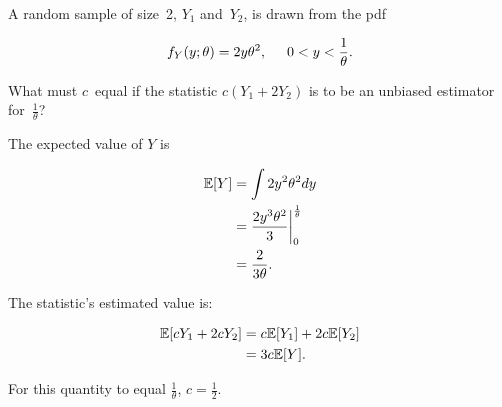 \begin{problem}
   A random sample of size~2, $Y_1$ and~$Y_2$, is drawn from the pdf

  \begin{equation}
    f_Y(y;\theta) = 2y\theta^2, \hspace{0.5cm}0 < y < \frac{1}{\theta} \text{.}
  \end{equation}

  \noindent
  What must $c$~equal if the statistic ${c(Y_1 + 2Y_2)}$ is to be an unbiased estimator for~$\frac{1}{\theta}$?
\end{problem}

The expected value of $Y$ is

\begin{align*}
  \mathbb{E}\lbrack Y\rbrack &= \int 2y^2 \theta^2 dy \\
             &= \frac{2y^3 \theta^2}{3} \bigg\vert_{0}^{\frac{1}{\theta}} \\
             &= \frac{2}{3\theta} \text{.}
\end{align*}

The statistic's estimated value is:

\begin{align*}
  \mathbb{E}\lbrack cY_1 + 2cY_2\rbrack &= c\mathbb{E}\lbrack Y_1\rbrack + 2c\mathbb{E}\lbrack Y_2\rbrack \\
                        &= 3c\mathbb{E}\lbrack Y\rbrack\text{.}
\end{align*}

For this quantity to equal $\frac{1}{\theta}$, $\boxed{c=\frac{1}{2}}$.
